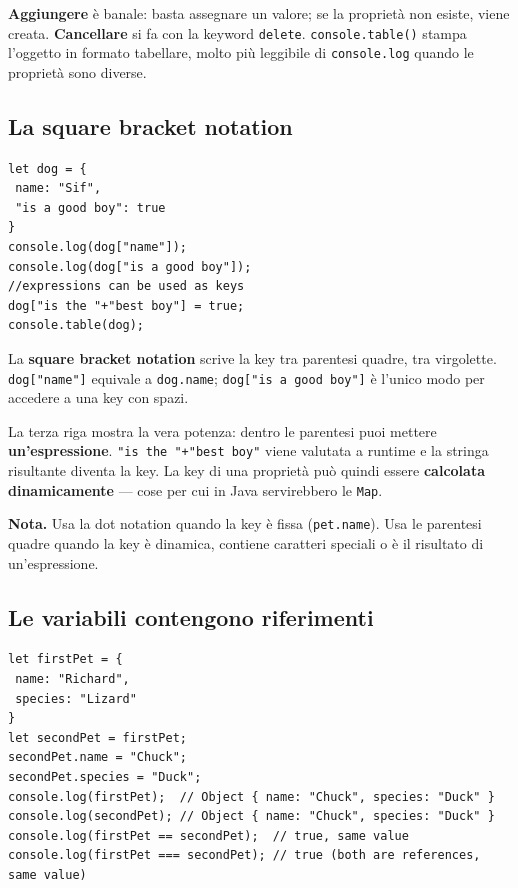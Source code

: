 \documentclass[10pt,a4paper]{article}
\newcommand{\nota}[1]{\textbf{\textcolor{ngreen}{Nota.}} #1}
\begin{document}
\textbf{Aggiungere} è banale: basta assegnare un valore; se la proprietà non esiste, viene creata. \textbf{Cancellare} si fa con la keyword \texttt{delete}. \texttt{console.table()} stampa l'oggetto in formato tabellare, molto più leggibile di \texttt{console.log} quando le proprietà sono diverse.

\subsection{La square bracket notation}

\begin{lstlisting}[style=js]
let dog = {
 name: "Sif",
 "is a good boy": true
}
console.log(dog["name"]);
console.log(dog["is a good boy"]);
//expressions can be used as keys
dog["is the "+"best boy"] = true;
console.table(dog);
\end{lstlisting}

La \textbf{square bracket notation} scrive la key tra parentesi quadre, tra virgolette. \texttt{dog["name"]} equivale a \texttt{dog.name}; \texttt{dog["is a good boy"]} è l'unico modo per accedere a una key con spazi.

La terza riga mostra la vera potenza: dentro le parentesi puoi mettere \textbf{un'espressione}. \texttt{"is the "+"best boy"} viene valutata a runtime e la stringa risultante diventa la key. La key di una proprietà può quindi essere \textbf{calcolata dinamicamente} --- cose per cui in Java servirebbero le \texttt{Map}.

\begin{notebox}
\nota{Usa la dot notation quando la key è fissa (\texttt{pet.name}). Usa le parentesi quadre quando la key è dinamica, contiene caratteri speciali o è il risultato di un'espressione.}
\end{notebox}

\subsection{Le variabili contengono riferimenti}

\begin{lstlisting}[style=js]
let firstPet = {
 name: "Richard",
 species: "Lizard"
}
let secondPet = firstPet;
secondPet.name = "Chuck";
secondPet.species = "Duck";
console.log(firstPet);  // Object { name: "Chuck", species: "Duck" }
console.log(secondPet); // Object { name: "Chuck", species: "Duck" }
console.log(firstPet == secondPet);  // true, same value
console.log(firstPet === secondPet); // true (both are references, same value)
\end{lstlisting}
\end{document}

